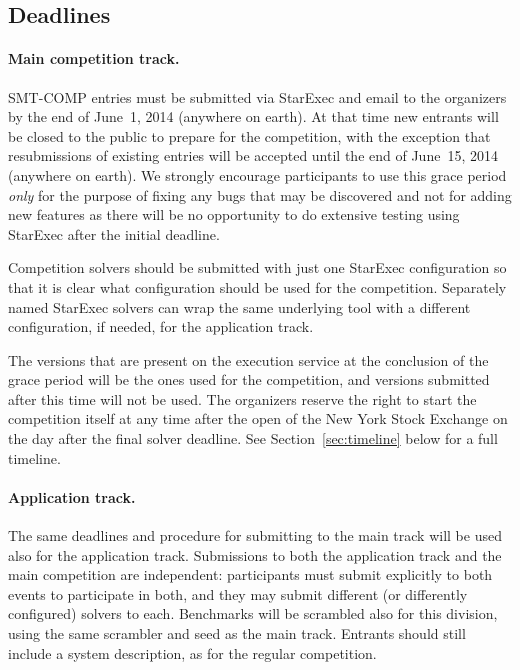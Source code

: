 \documentclass[12pt]{article}
\begin{document}
\subsection*{Deadlines} %


\paragraph{Main competition track.} %
SMT-COMP entries must be submitted via StarExec and email to the organizers by the end of June~1, 2014 (anywhere on earth).  At that time new entrants will be
closed to the public to prepare for the competition, with the
exception that resubmissions of existing entries will be accepted
until the end of June~15, 2014 (anywhere on earth).  We strongly encourage
participants to use this grace period \emph{only} for the
purpose of fixing any bugs that may be discovered and not for adding
new features as there will be no opportunity to do extensive testing
using StarExec after the initial deadline.

Competition solvers should be submitted with just one StarExec configuration so that it is
clear what configuration should be used for the competition. Separately named StarExec solvers can wrap the same underlying tool with a different configuration, if needed, for the application track.

The versions that are present on the execution service at the conclusion of the
grace period will be the ones used for the competition, and versions
submitted after this time will not be used.  The organizers reserve
the right to start the competition itself at any time after the open
of the New York Stock Exchange on the day after the final solver deadline.  See
Section~\ref{sec:timeline} below for a full timeline.

\paragraph{Application track.} %
The same deadlines and procedure for submitting to the main track will be used
also for the application track. Submissions to both the application track and
the main competition are independent: participants must submit explicitly to
both events to participate in both, and they may submit different (or
differently configured) solvers to each.  Benchmarks will be scrambled also
for this division, using the same scrambler and seed as the main track.
Entrants should still include a system description, as for the regular
competition.
\end{document}
